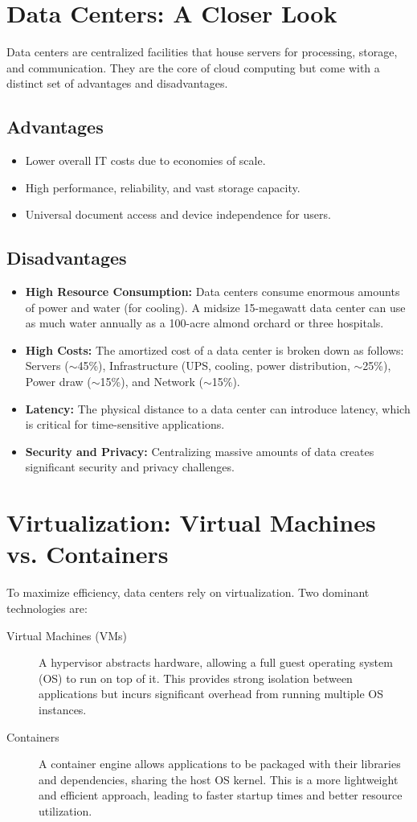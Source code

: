 \section{Data Centers: A Closer Look}
Data centers are centralized facilities that house servers for processing, storage, and communication. They are the core of cloud computing but come with a distinct set of advantages and disadvantages.

\subsection{Advantages}
\begin{itemize}
    \item Lower overall IT costs due to economies of scale.
    \item High performance, reliability, and vast storage capacity.
    \item Universal document access and device independence for users.
\end{itemize}

\subsection{Disadvantages}
\begin{itemize}
    \item \textbf{High Resource Consumption:} Data centers consume enormous amounts of power and water (for cooling). A midsize 15-megawatt data center can use as much water annually as a 100-acre almond orchard or three hospitals.
    \item \textbf{High Costs:} The amortized cost of a data center is broken down as follows: Servers ($\sim$45\%), Infrastructure (UPS, cooling, power distribution, $\sim$25\%), Power draw ($\sim$15\%), and Network ($\sim$15\%).
    \item \textbf{Latency:} The physical distance to a data center can introduce latency, which is critical for time-sensitive applications.
    \item \textbf{Security and Privacy:} Centralizing massive amounts of data creates significant security and privacy challenges.
\end{itemize}

\section{Virtualization: Virtual Machines vs. Containers}
To maximize efficiency, data centers rely on virtualization. Two dominant technologies are:
\begin{description}
    \item[Virtual Machines (VMs)] A hypervisor abstracts hardware, allowing a full guest operating system (OS) to run on top of it. This provides strong isolation between applications but incurs significant overhead from running multiple OS instances.
    \item[Containers] A container engine allows applications to be packaged with their libraries and dependencies, sharing the host OS kernel. This is a more lightweight and efficient approach, leading to faster startup times and better resource utilization.
\end{description}

